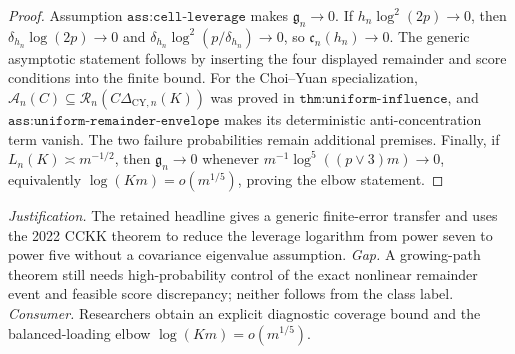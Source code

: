 \documentclass{article}
\begin{document}
\begin{proof}
Assumption \(\texttt{ass:cell-leverage}\) makes \(\mathfrak g_n\to0\).
If \(h_n\log^2(2p)\to0\), then
\(\delta_{h_n}\log(2p)\to0\) and
\(\delta_{h_n}\log^2(p/\delta_{h_n})\to0\), so
\(\mathfrak c_n(h_n)\to0\).  The generic asymptotic statement follows
by inserting the four displayed remainder and score conditions into the
finite bound.  For the Choi--Yuan specialization,
\(\mathcal A_n(C)\subseteq
\mathcal R_n(C\Delta_{\mathrm{CY},n}(K))\) was proved in
\(\texttt{thm:uniform-influence}\), and
\(\texttt{ass:uniform-remainder-envelope}\) makes its deterministic
anti-concentration term vanish.  The two failure probabilities remain
additional premises.  Finally, if \(L_n(K)\asymp m^{-1/2}\), then
\(\mathfrak g_n\to0\) whenever
\(m^{-1}\log^5((p\vee3)m)\to0\), equivalently
\(\log(Km)=o(m^{1/5})\), proving the elbow statement.
\end{proof}
\par\smallskip\noindent \textit{Justification.} The retained headline gives a generic finite-error transfer and uses the 2022 CCKK theorem to reduce the leverage logarithm from power seven to power five without a covariance eigenvalue assumption. \textit{Gap.} A growing-path theorem still needs high-probability control of the exact nonlinear remainder event and feasible score discrepancy; neither follows from the class label. \textit{Consumer.} Researchers obtain an explicit diagnostic coverage bound and the balanced-loading elbow \(\log(Km)=o(m^{1/5})\).
\end{document}
